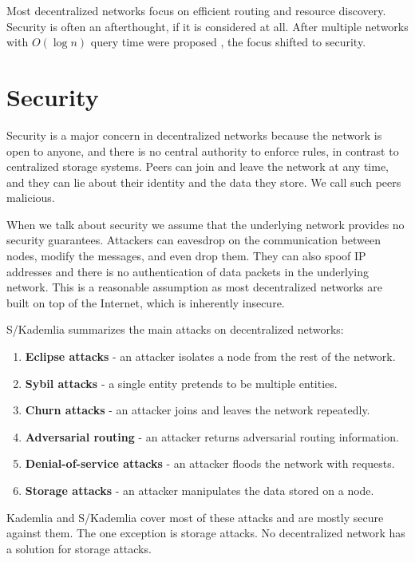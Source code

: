 Most decentralized networks focus on efficient routing and resource discovery.
Security is often an afterthought, if it is considered at all.
After multiple networks with $O(\log n)$ query time were proposed \cite{chord, kademlia, pastry},
the focus shifted to security.

\section{Security}

Security is a major concern in decentralized networks because
the network is open to anyone, and there is no central authority to enforce rules,
in contrast to centralized storage systems.
Peers can join and leave the network at any time, and they can lie about their identity and the data they store.
We call such peers malicious.

When we talk about security we assume that the underlying network provides no security guarantees.
Attackers can eavesdrop on the communication between nodes, modify the messages, and even drop them.
They can also spoof IP addresses and there is no authentication of data packets in the underlying network.
This is a reasonable assumption as most decentralized networks are built on top of the Internet,
which is inherently insecure.

S/Kademlia \cite{skademlia} summarizes the main attacks on decentralized networks:
\begin{enumerate}
    \item \textbf{Eclipse attacks} - an attacker isolates a node from the rest of the network.
    \item \textbf{Sybil attacks} - a single entity pretends to be multiple entities.
    \item \textbf{Churn attacks} - an attacker joins and leaves the network repeatedly.
    \item \textbf{Adversarial routing} - an attacker returns adversarial routing information.
    \item \textbf{Denial-of-service attacks} - an attacker floods the network with requests.
    \item \textbf{Storage attacks} - an attacker manipulates the data stored on a node.
\end{enumerate}

Kademlia and S/Kademlia cover most of these attacks and are mostly secure against them.
The one exception is storage attacks.
No decentralized network has a solution for storage attacks.

